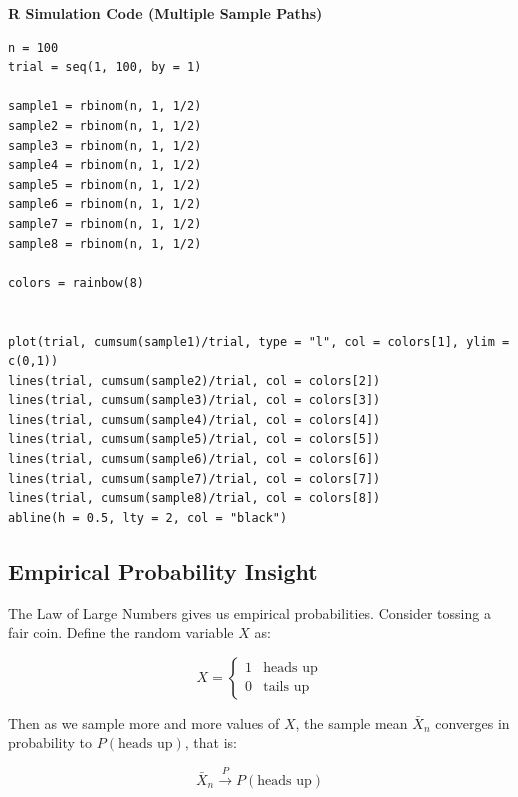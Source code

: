 {\color{gray} \textbf{R Simulation Code (Multiple Sample Paths)}}


\begin{verbatim}
n = 100
trial = seq(1, 100, by = 1)

sample1 = rbinom(n, 1, 1/2)
sample2 = rbinom(n, 1, 1/2)
sample3 = rbinom(n, 1, 1/2)
sample4 = rbinom(n, 1, 1/2)
sample5 = rbinom(n, 1, 1/2)
sample6 = rbinom(n, 1, 1/2)
sample7 = rbinom(n, 1, 1/2)
sample8 = rbinom(n, 1, 1/2)

colors = rainbow(8)


plot(trial, cumsum(sample1)/trial, type = "l", col = colors[1], ylim = c(0,1))
lines(trial, cumsum(sample2)/trial, col = colors[2])
lines(trial, cumsum(sample3)/trial, col = colors[3])
lines(trial, cumsum(sample4)/trial, col = colors[4])
lines(trial, cumsum(sample5)/trial, col = colors[5])
lines(trial, cumsum(sample6)/trial, col = colors[6])
lines(trial, cumsum(sample7)/trial, col = colors[7])
lines(trial, cumsum(sample8)/trial, col = colors[8])
abline(h = 0.5, lty = 2, col = "black")
\end{verbatim}


\subsection*{Empirical Probability Insight}


The Law of Large Numbers gives us empirical probabilities. Consider tossing a fair coin. Define the random variable \( X \) as:

\[
X = \begin{cases}
1 & \text{heads up} \\
0 & \text{tails up}
\end{cases}
\]

Then as we sample more and more values of \( X \), the sample mean \( \bar{X}_n \) converges in probability to \( P(\text{heads up}) \), that is:

\[
\bar{X}_n \xrightarrow{P} P(\text{heads up}) 
\]


